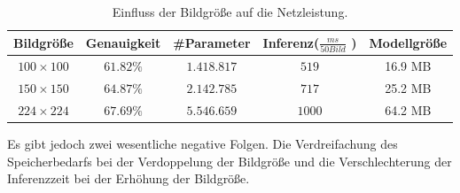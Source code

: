 \documentclass[12pt,a4paper]{scrartcl}
\numberwithin{equation}{section}
\begin{document}
\begin{table}[h!]
		\centering
		\begin{tabular}{*{5}{|c}| }
			\hline
			 Bildgröße & Genauigkeit & \#Parameter&Inferenz($ \frac{ms}{50Bild} $ ) & Modellgröße\\ \hline
			$ 100\times100 $&$ 61.82\% $ &$ 1.418.817 $&$ 519 $ & 16.9 MB \\ \hline
		   $ 150\times150 $&$ 64.87\% $ &$ 2.142.785 $ &$ 717  $& 25.2 MB \\ \hline	
			$ 224\times224 $&$ 67.69\% $ &$  5.546.659 $&$ 1000 $& 64.2 MB \\ \hline
		\end{tabular}
		\caption{Einfluss der Bildgröße auf die Netzleistung.}
		\label{tab:Bildqualtaet}
	\end{table}
%		
Es gibt jedoch zwei wesentliche negative Folgen. Die Verdreifachung des Speicherbedarfs bei der Verdoppelung der Bildgröße und die Verschlechterung der Inferenzzeit bei der Erhöhung der Bildgröße.
\end{document}
